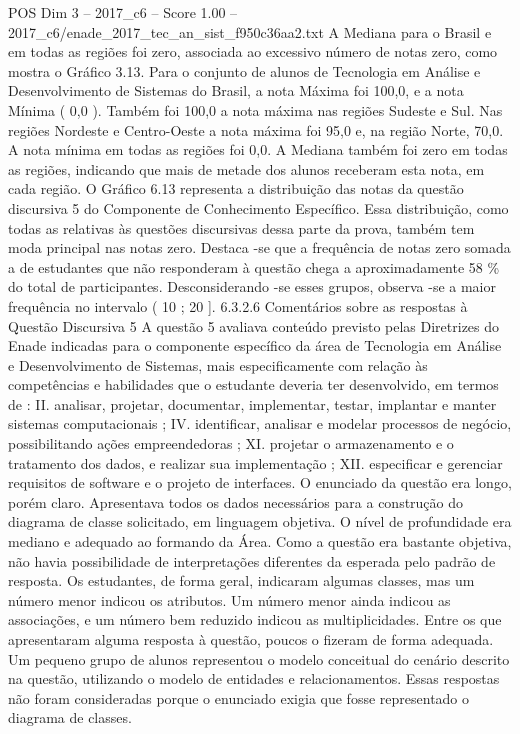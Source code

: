 \begin{textsample}{POS Dim 3 – 2017\_c6 – Score 1.00 – 2017\_c6/enade\_2017\_tec\_an\_sist\_f950c36aa2.txt}
A Mediana para o Brasil e em todas as regiões foi zero, associada ao excessivo número de notas zero, como mostra o Gráfico 3.13.
Para o conjunto de alunos de Tecnologia em Análise e Desenvolvimento de Sistemas do Brasil, a nota Máxima foi 100,0, e a nota Mínima ( 0,0 ).
Também foi 100,0 a nota máxima nas regiões Sudeste e Sul.
Nas regiões Nordeste e Centro-Oeste a nota máxima foi 95,0 e, na região Norte, 70,0.
A nota mínima em todas as regiões foi 0,0.
A Mediana também foi zero em todas as regiões, indicando que mais de metade dos alunos receberam esta nota, em cada região.
O Gráfico 6.13 representa a distribuição das notas da questão discursiva 5 do Componente de Conhecimento Específico.
Essa distribuição, como todas as relativas às questões discursivas dessa parte da prova, também tem moda principal nas notas zero.
Destaca -se que a frequência de notas zero somada a de estudantes que não responderam à questão chega a aproximadamente 58 \% do total de participantes.
Desconsiderando -se esses grupos, observa -se a maior frequência no intervalo ( 10 ; 20 ]. 6.3.2.6 Comentários sobre as respostas à Questão Discursiva 5 A questão 5 avaliava conteúdo previsto pelas Diretrizes do Enade indicadas para o componente específico da área de Tecnologia em Análise e Desenvolvimento de Sistemas, mais especificamente com relação às competências e habilidades que o estudante deveria ter desenvolvido, em termos de : II. analisar, projetar, documentar, implementar, testar, implantar e manter sistemas computacionais ; IV. identificar, analisar e modelar processos de negócio, possibilitando ações empreendedoras ; XI. projetar o armazenamento e o tratamento dos dados, e realizar sua implementação ; XII. especificar e gerenciar requisitos de software e o projeto de interfaces.
O enunciado da questão era longo, porém claro.
Apresentava todos os dados necessários para a construção do diagrama de classe solicitado, em linguagem objetiva.
O nível de profundidade era mediano e adequado ao formando da Área.
Como a questão era bastante objetiva, não havia possibilidade de interpretações diferentes da esperada pelo padrão de resposta.
Os estudantes, de forma geral, indicaram algumas classes, mas um número menor indicou os atributos.
Um número menor ainda indicou as associações, e um número bem reduzido indicou as multiplicidades.
Entre os que apresentaram alguma resposta à questão, poucos o fizeram de forma adequada.
Um pequeno grupo de alunos representou o modelo conceitual do cenário descrito na questão, utilizando o modelo de entidades e relacionamentos.
Essas respostas não foram consideradas porque o enunciado exigia que fosse representado o diagrama de classes.

\end{textsample}
